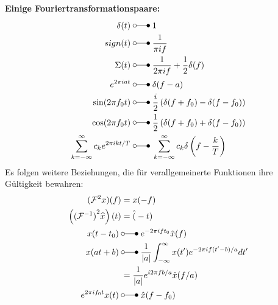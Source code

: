\textbf{Einige Fouriertransformationspaare:}
\begin{align*}
    \delta(t) \;                                  & \laplace\; 1                                                        \\
    sign(t) \;                                    & \laplace\; \frac{1}{\pi if}                                         \\
    \Sigma(t) \;                                  & \laplace\; \frac{1}{2\pi if}+\frac{1}{2}\delta(f)                   \\
    e^{2\pi iat} \;                               & \laplace\; \delta(f-a)                                              \\
    \sin(2\pi f_0t) \;                            & \laplace\; \frac{i}{2}\left(\delta(f+f_0)-\delta(f-f_0)\right)      \\
    \cos(2\pi f_0t) \;                            & \laplace\; \frac{1}{2}\left(\delta(f+f_0)+\delta(f-f_0)\right)      \\
    \sum_{k=-\infty}^\infty c_k e^{2\pi ikt/T} \; & \laplace\; \sum_{k=-\infty}^\infty c_k\delta\left(f-\frac kT\right)
\end{align*}
Es folgen weitere Beziehungen, die für verallgemeinerte Funktionen ihre Gültigkeit bewahren:
\begin{align*}
    (\mathcal{F}^2x)(f)                               & = x(-f)                                                                     \\
    \left({(\mathcal{F}^{-1})}^2\widehat{x}\right)(t) & = \hat(-t)                                                                  \\
    x(t-t_{0}) \;                                     & \laplace\; e^{-2\pi ift_0}\hat{x}(f)                                        \\
    x(at+b) \;                                        & \laplace\; \frac{1}{|a|}\int_{-\infty}^{\infty}x(t')e^{-2\pi if(t'-b)/a}dt' \\
                                                      & =\frac1{|a|}e^{i2\pi fb/a}\hat{x}(f/a)                                      \\
    e^{2\pi if_{0}t}x(t) \;                           & \laplace\; \hat{x}(f-f_0)
\end{align*}

